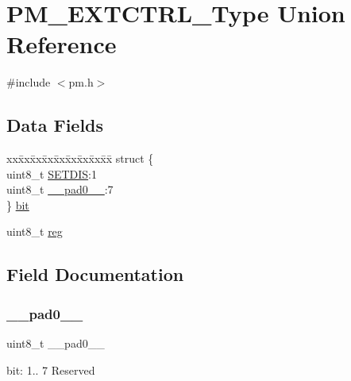 \hypertarget{union_p_m___e_x_t_c_t_r_l___type}{}\section{P\+M\+\_\+\+E\+X\+T\+C\+T\+R\+L\+\_\+\+Type Union Reference}
\label{union_p_m___e_x_t_c_t_r_l___type}


{\ttfamily \#include $<$pm.\+h$>$}

\subsection*{Data Fields}
\begin{DoxyCompactItemize}
\item 
\begin{tabbing}
xx\=xx\=xx\=xx\=xx\=xx\=xx\=xx\=xx\=\kill
struct \{\\
\>uint8\_t \mbox{\hyperlink{union_p_m___e_x_t_c_t_r_l___type_a7d18439c851060a7996e4e50255b5b27}{SETDIS}}:1\\
\>uint8\_t \mbox{\hyperlink{union_p_m___e_x_t_c_t_r_l___type_a8b4eebe79ded0459acec2f4950102ba3}{\_\_pad0\_\_}}:7\\
\} \mbox{\hyperlink{union_p_m___e_x_t_c_t_r_l___type_a25dab38084185b0da6cfa44a34e6ebff}{bit}}\\

\end{tabbing}\item 
uint8\+\_\+t \mbox{\hyperlink{union_p_m___e_x_t_c_t_r_l___type_a9428adc9af4653a2050e2536b55dec8d}{reg}}
\end{DoxyCompactItemize}


\subsection{Field Documentation}
\mbox{\label{union_p_m___e_x_t_c_t_r_l___type_a8b4eebe79ded0459acec2f4950102ba3}} 
\subsubsection{\texorpdfstring{\_\_pad0\_\_}{\_\_pad0\_\_}}
{\footnotesize\ttfamily uint8\+\_\+t \+\_\+\+\_\+pad0\+\_\+\+\_\+}

bit\+: 1.. 7 Reserved \mbox{\label{union_p_m___e_x_t_c_t_r_l___type_a25dab38084185b0da6cfa44a34e6ebff}} 
